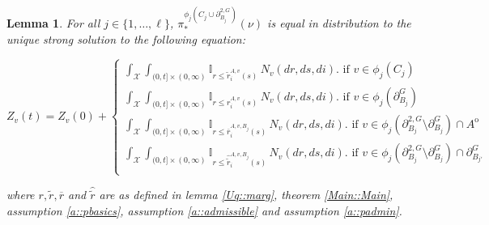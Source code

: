 \documentclass[12pt]{article}
\newcommand{\mb}{\mathbb}
\newcommand{\mc}{\mathcal}
\newcommand{\ov}{\overline}
\newcommand{\te}{\text}
\newcommand{\sta}{\mc{X}}							%
\newcommand{\gneigh}[2]{\partial^{#1}_{#2}}			%
\newcommand{\dgneigh}[2]{\partial^{2,#1}_{#2}}		%
\newcommand{\poiss}{N}								%
\newcommand{\rate}{r}								%
\newcommand{\proj}{\pi}								%
\newcommand{\poissv}[1]{_{#1}}						%
\newcommand{\vind}[1]{_{#1}}						%
\newcommand{\tme}[1]{(#1)}							%
\newcommand{\vpara}[1]{^{#1}}						%
\newcommand{\stpara}[1]{_{#1}}						%
\newcommand{\gvpara}[2]{^{#1,#2}}					%
\newcommand{\psf}{_*}								%
\newcommand{\psize}{\ell}							%
\newcommand{\brate}{\alt{\rate}}					%
\newcommand{\inte}[1]{{#1}^\mathrm{o}}				%
\newcommand{\alt}[1]{\tilde{#1}}					%
\newcommand{\mm}{\nu}								%
\newcommand{\Xh}{Z}									%
\newcommand{\bgrate}{\ov{\rate}}					%
\newcommand{\bcrate}{\hat{\brate}}					%
\newcommand{\gvjpara}[3]{^{#1,#2,#3}}				%
\newtheorem{lem}[thms]{Lemma}
\begin{document}
\begin{lem}
For all \(j \in \{1,\dots,\psize\}\), \(\proj\psf\vpara{\phi_j\left(C_j\cup\dgneigh{G}{B_j}\right)}(\mm)\) is equal in distribution to the unique strong solution to the following equation:

\begin{equation}
\Xh\vind{v}\tme{t} = \Xh\vind{v}\tme{0} + \begin{cases}
\int_\sta\int_{(0,t]\times(0,\infty)} \mb{I}_{r \leq \brate\gvpara{A}{v}\stpara{i}\tme{s}}\,\poiss\poissv{v}(dr,ds,di).\te{ if } v \in \phi_j(C_j)\\
\int_\sta\int_{(0,t]\times(0,\infty)} \mb{I}_{r \leq \rate\gvpara{A}{v}\stpara{i}\tme{s}}\,\poiss\poissv{v}(dr,ds,di).\te{ if } v \in \phi_j(\gneigh{G}{B_j})\\
\int_\sta\int_{(0,t]\times(0,\infty)} \mb{I}_{r \leq \bgrate\gvjpara{A}{v}{B_j}\stpara{i}\tme{s}}\,\poiss\poissv{v}(dr,ds,di).\te{ if } v \in \phi_j(\dgneigh{G}{B_j}\setminus\gneigh{G}{B_j})\cap\inte{A}\\
\int_\sta\int_{(0,t]\times(0,\infty)} \mb{I}_{r \leq \bcrate\gvjpara{A}{v}{B_j}\stpara{i}\tme{s}}\,\poiss\poissv{v}(dr,ds,di).\te{ if } v \in \phi_j(\dgneigh{G}{B_j}\setminus\gneigh{G}{B_j})\cap\gneigh{G}{B_{j'}}\\
\end{cases}
\label{Uq::marg2eqn}
\end{equation}

where \(\rate,\brate,\bgrate\) and \(\bcrate\) are as defined in lemma \ref{Uq::marg}, theorem \ref{Main::Main}, assumption \ref{a::pbasics}, assumption \ref{a::admissible} and assumption \ref{a::padmin}.
\label{Uq::marg2}
\end{lem}
\end{document}
